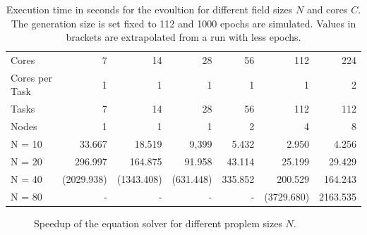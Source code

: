 \documentclass[12pt]{article}
\begin{document}
\begin{table}[p]
    \centering
    \begin{tabular}{lrrrrrr}
        \toprule
        Cores & 7 & 14 & 28 & 56 & 112 & 224 \\
        Cores per Task & 1 & 1 & 1 & 1 & 1 & 2 \\
        Tasks & 7 & 14 & 28 & 56 & 112 & 112 \\
        Nodes & 1 & 1 & 1 & 2 & 4 & 8 \\
        \midrule
        N = 10 & 33.667     & 18.519 & 9,399 & 5.432 & 2.950 & 4.256 \\
        N = 20 & 296.997    & 164.875 & 91.958 & 43.114 & 25.199 & 29.429 \\
        N = 40 & (2029.938) & (1343.408) & (631.448) & 335.852 & 200.529 & 164.243 \\
        N = 80 & - & - & - & - & (3729.680) & 2163.535 \\
        \bottomrule
    \end{tabular}
    \caption{Execution time in seconds for the evoultion for different field sizes $N$ and cores $C$. The generation size is set fixed to 112 and 1000 epochs are simulated. Values in brackets are extrapolated from a run with less epochs.}
    \label{tab:SpeedupEvolution}
\end{table}

\begin{figure}[p]
    \centering
    
    \caption{Speedup of the equation solver for different proplem sizes $N$.}
    \label{fig:SpeedupEvolution}
\end{figure}


\clearpage
\end{document}
